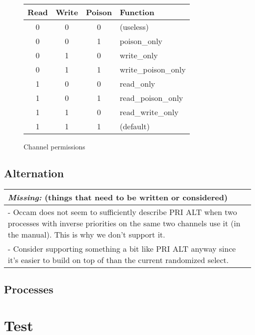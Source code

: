 \documentclass[a4paper,12pt]{article}
\newcommand{\missing}[1]{
\begin{tabular}{|p{11cm}|}
\hline
\emph{Missing:} {\scriptsize (things that need to be written or considered)} \\
\hline
#1
\hline
\end{tabular}
}
\begin{document}
\begin{figure}[h]
\centering
\begin{tabular}{c|c|c|l}
Read & Write & Poison & Function \\
\hline
0 & 0 & 0 & (useless) \\
0 & 0 & 1 & poison\_only \\
0 & 1 & 0 & write\_only \\
0 & 1 & 1 & write\_poison\_only \\
1 & 0 & 0 & read\_only \\
1 & 0 & 1 & read\_poison\_only \\
1 & 1 & 0 & read\_write\_only \\
1 & 1 & 1 & (default) \\
\end{tabular}
\caption{Channel permissions}
\label{channel-permissions}
\end{figure}

\subsection{Alternation}

\missing{
- Occam does not seem to sufficiently describe PRI ALT when two processes with inverse priorities
on the same two channels use it (in the manual). This is why we don't support it. \\
- Consider supporting something a bit like PRI ALT anyway since it's easier to build on top of
than the current randomized select. \\
}

\subsection{Processes}

\section{Test}
\end{document}
